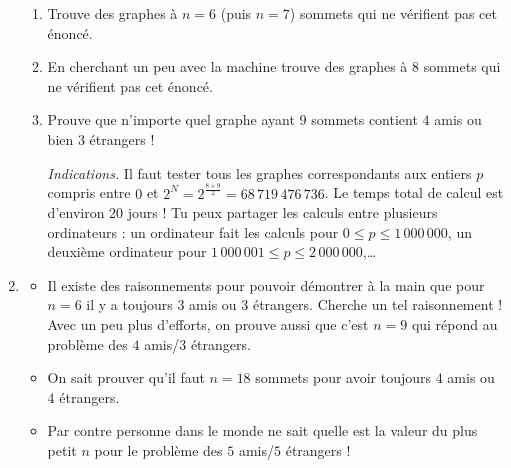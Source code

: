 \documentclass[11pt,class=report,crop=false]{standalone}
\begin{document}
\begin{activite}
\begin{enumerate}
  \begin{enumerate}
    \item Trouve des graphes à $n=6$ (puis $n=7$) sommets qui ne vérifient pas cet énoncé.
    \item En cherchant un peu avec la machine trouve des graphes à $8$ sommets qui ne vérifient pas cet énoncé.
    \item Prouve que n'importe quel graphe ayant $9$ sommets contient $4$ amis ou bien $3$ étrangers ! 
     
  \emph{Indications.} Il faut tester tous les graphes correspondants aux entiers $p$ compris entre $0$ et $2^N = 2^{\frac{8 \times 9}{2}} = 68\,719\,476\,736$. Le temps total de calcul est d'environ 20 jours ! Tu peux partager les calculs entre plusieurs ordinateurs : un ordinateur fait les calculs pour $0 \le p \le 1\,000\,000$, un deuxième ordinateur pour $1\,000\,001 \le p \le 2\,000\,000$,\ldots
    
  \end{enumerate}
  
  \item 
  \begin{itemize}
    \item   Il existe des raisonnements pour pouvoir démontrer à la main que pour $n=6$ il y a toujours $3$ amis ou $3$ étrangers. Cherche un tel raisonnement ! Avec un peu plus d'efforts, on prouve aussi que c'est $n=9$ qui répond au problème des $4$ amis/$3$ étrangers.
    
    \item On sait prouver qu'il faut $n=18$ sommets pour avoir toujours $4$ amis ou $4$ étrangers.
    
    \item Par contre personne dans le monde ne sait quelle est la valeur du plus petit $n$ pour le problème des $5$ amis/$5$ étrangers !
  \end{itemize}

\end{enumerate}

\end{activite}

%
%
%
%
%
\end{document}
